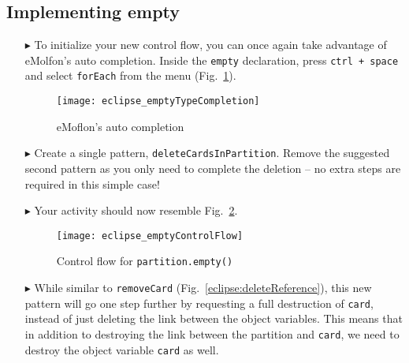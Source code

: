 \newpage
\hypertarget{emptyPartition tex}{}
\subsection{Implementing empty}
\texHeader

\begin{itemize}
 
\item[$\blacktriangleright$] To initialize your new control flow, you can once again take advantage of eMolfon's auto completion. Inside the
\texttt{empty} declaration, press  \texttt{ctrl + space} and select \texttt{forEach} from the menu (Fig.~\ref{eclipse:typeCompletion}).

\vspace{1cm}

\begin{figure}[htpb]
\begin{center}
  \texttt{[image: eclipse\_emptyTypeCompletion]}
  \caption{eMoflon's auto completion}
  \label{eclipse:typeCompletion}
\end{center}
\end{figure}

\vspace{1cm}

\item[$\blacktriangleright$] Create a single pattern, \texttt{deleteCardsInPartition}. Remove the suggested second pattern as you only need to complete the
deletion -- no extra steps are required in this simple case!

\item[$\blacktriangleright$] Your activity should now resemble Fig.~\ref{eclipse:emptyControlFlow}.

\clearpage

\begin{figure}[htpb]
\begin{center}
  \texttt{[image: eclipse\_emptyControlFlow]}
  \caption{Control flow for \texttt{partition.empty()}}
  \label{eclipse:emptyControlFlow}
\end{center}
\end{figure}

\item[$\blacktriangleright$] While similar to \texttt{removeCard} (Fig.~\ref{eclipse:deleteReference}), this new pattern will go one step further by requesting
a full destruction of \texttt{card}, instead of just deleting the link between the object variables. This means that in addition to destroying the link between
the partition and \texttt{card}, we need to destroy the object variable \texttt{card} as well.


\end{itemize}
